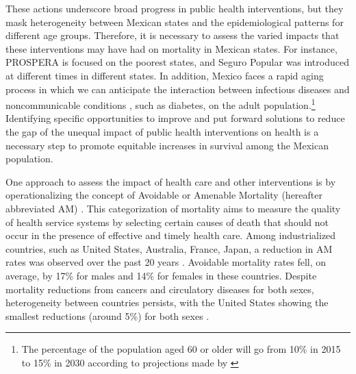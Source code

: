 \documentclass[11.5pt]{article}
\begin{document}
\begin{spacing}{1.5}
These actions underscore broad progress in public health interventions, but they mask heterogeneity between Mexican states and the epidemiological patterns for different age groups. Therefore, it is necessary to assess the varied impacts that these interventions may have had on mortality in Mexican states. For instance, PROSPERA is focused on the poorest states, and Seguro Popular was introduced at different times in different states. In addition, Mexico faces a rapid aging process in which we can anticipate the interaction between infectious diseases and noncommunicable conditions \citep{Bygbjerg1499}, such as diabetes, on the adult population.\footnote{The percentage of the population aged 60 or older will go from 10\% in 2015 to 15\% in 2030 according to projections made by \citet{CONAPO}} Identifying specific opportunities to improve and put forward solutions to reduce the gap of  the unequal impact of public health interventions on health is a necessary step to promote equitable increases in survival among the Mexican population.%
 
 One approach to assess the impact of health care and other interventions is by operationalizing the
 concept of Avoidable or Amenable Mortality (hereafter abbreviated AM)
 \citep{nolte&mckee2004, nolte&mckee2008,elo2014}. This categorization of mortality aims to measure the quality of health service systems by selecting certain
 causes of death that should not occur in the presence of effective and
 timely health care. Among industrialized countries, such as United States,
 Australia, France, Japan, a reduction in AM rates was
 observed over the past 20 years
 \citep{nolte&mckee2008}. Avoidable mortality rates fell, on average, by 17\%
 for males and 14\% for females in these countries. Despite mortality reductions from cancers and circulatory diseases for
 both sexes, heterogeneity between countries persists, with the United
 States showing the smallest reductions (around 5\%) for both sexes  \citep{nolte&mckee2008}. 
 

\end{spacing}
\end{document}
